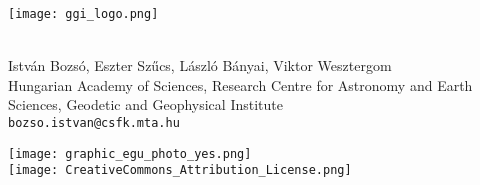 \documentclass[a0, 18pt, landscape]{a0poster}
\begin{document}

\bfseries

\begin{mdframed}[linecolor=black, linewidth=5pt, innerleftmargin=10pt, innerrightmargin=10pt, innertopmargin=25pt, innerbottommargin=25pt, backgroundcolor=tcol, roundcorner=10pt]
    \hspace{25pt}
    \begin{minipage}[c]{0.1\textwidth}
        \texttt{[image: ggi\_logo.png]}
    \end{minipage}
    \begin{minipage}[c]{0.8\textwidth}
      \\[35pt] %
      {\Large István Bozsó, Eszter Szűcs, László Bányai, Viktor Wesztergom }\\[20pt]
     {\Large \normalfont Hungarian Academy of Sciences, Research Centre for Astronomy and Earth Sciences, Geodetic and Geophysical Institute}\\[25pt]
    {\Large \texttt{bozso.istvan@csfk.mta.hu}}
    \end{minipage}
    \hspace{50pt}
    \begin{minipage}[c]{0.05\textwidth}
    \begin{center}
        \texttt{[image: graphic\_egu\_photo\_yes.png]}\\[10pt]
        \texttt{[image: CreativeCommons\_Attribution\_License.png]}
    \end{center}
    \end{minipage}
\end{mdframed}



\small
\end{document}
